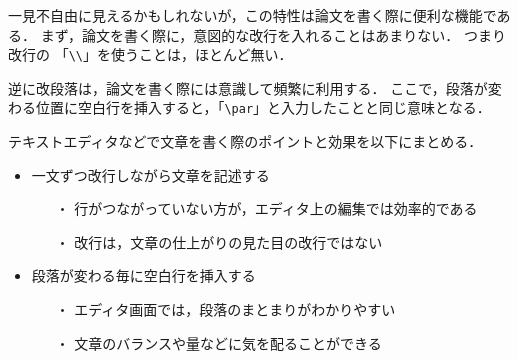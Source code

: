 \documentclass[a4paper,10pt,twocolumn]{jsarticle}
\begin{document}
一見不自由に見えるかもしれないが，この特性は論文を書く際に便利な機能である．
まず，論文を書く際に，意図的な改行を入れることはあまりない．
つまり改行の 「\verb+\\+」を使うことは，ほとんど無い．

逆に改段落は，論文を書く際には意識して頻繁に利用する．
ここで，段落が変わる位置に空白行を挿入すると，「\verb+\par+」と入力したことと同じ意味となる．

テキストエディタなどで文章を書く際のポイントと効果を以下にまとめる．
\begin{itemize}
\item 一文ずつ改行しながら文章を記述する
\begin{itemize}
\item[・] 行がつながっていない方が，エディタ上の編集では効率的である
\item[・] 改行は，文章の仕上がりの見た目の改行ではない
\end{itemize}
\item 段落が変わる毎に空白行を挿入する
\begin{itemize}
\item[・] エディタ画面では，段落のまとまりがわかりやすい
\item[・] 文章のバランスや量などに気を配ることができる
\end{itemize}
\end{itemize}
\end{document}
